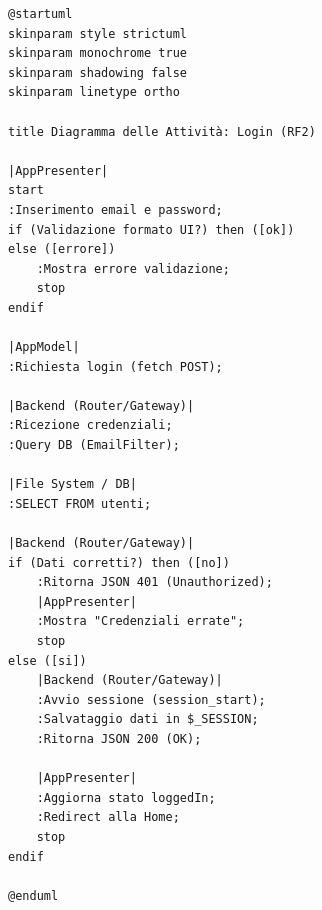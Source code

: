 \begin{verbatim}
@startuml
skinparam style strictuml
skinparam monochrome true
skinparam shadowing false
skinparam linetype ortho

title Diagramma delle Attività: Login (RF2)

|AppPresenter|
start
:Inserimento email e password;
if (Validazione formato UI?) then ([ok])
else ([errore])
    :Mostra errore validazione;
    stop
endif

|AppModel|
:Richiesta login (fetch POST);

|Backend (Router/Gateway)|
:Ricezione credenziali;
:Query DB (EmailFilter);

|File System / DB|
:SELECT FROM utenti;

|Backend (Router/Gateway)|
if (Dati corretti?) then ([no])
    :Ritorna JSON 401 (Unauthorized);
    |AppPresenter|
    :Mostra "Credenziali errate";
    stop
else ([si])
    |Backend (Router/Gateway)|
    :Avvio sessione (session_start);
    :Salvataggio dati in $_SESSION;
    :Ritorna JSON 200 (OK);
        
    |AppPresenter|
    :Aggiorna stato loggedIn;
    :Redirect alla Home;
    stop
endif

@enduml
\end{verbatim}